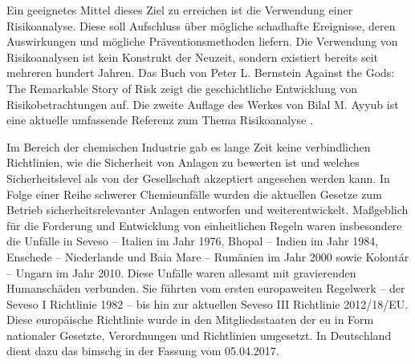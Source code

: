 Ein geeignetes Mittel dieses Ziel zu erreichen ist die Verwendung einer Risikoanalyse. Diese soll Aufschluss \"uber m\"ogliche schadhafte Ereignisse, deren Auswirkungen und m\"ogliche Pr\"aventionsmethoden liefern. Die Verwendung von Risikoanalysen ist kein Konstrukt der Neuzeit, sondern existiert bereits seit mehreren hundert Jahren. Das Buch von Peter L. Bernstein \glqq Against the Gods: The Remarkable Story of Risk\grqq { } \cite{Bernstein_1998} zeigt die geschichtliche Entwicklung von Risikobetrachtungen auf. Die zweite Auflage des Werkes von Bilal M. Ayyub ist eine aktuelle umfassende Referenz zum Thema Risikoanalyse \cite{Ayyub_2014}.

Im Bereich der chemischen Industrie gab es lange Zeit keine verbindlichen Richtlinien, wie die Sicherheit von Anlagen zu bewerten ist und welches Sicherheitslevel als von der Gesellschaft akzeptiert angesehen werden kann. In Folge einer Reihe schwerer Chemieunf\"alle wurden die aktuellen Gesetze zum Betrieb sicherheitsrelevanter Anlagen entworfen und weiterentwickelt.\linebreak
Ma\ss{}geblich f\"ur die Forderung und Entwicklung von einheitlichen Regeln waren insbesondere die Unf\"alle in Seveso -- Italien im Jahr 1976, Bhopal -- Indien im Jahr 1984, Enschede -- Niederlande und Baia Mare -- Rum\"anien im Jahr 2000 sowie Kolont\'ar -- Ungarn im Jahr 2010. Diese Unf\"alle waren allesamt mit gravierenden Humansch\"aden verbunden. Sie f\"uhrten vom ersten europaweiten Regelwerk -- der Seveso I Richtlinie 1982 -- bis hin zur aktuellen Seveso III Richtlinie 2012/18/EU. Diese europ\"aische Richtlinie wurde in den Mitgliedsstaaten der \ac{eu} in Form nationaler Gesetzte, Verordnungen und Richtlinien umgesetzt. In Deutschland dient dazu das \ac{bimschg} in der Fassung vom 05.04.2017.

